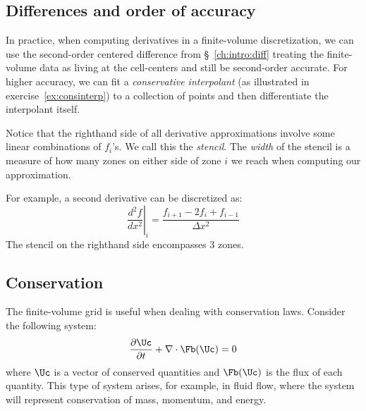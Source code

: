 \subsection{Differences and order of accuracy}

In practice, when computing derivatives in a finite-volume
discretization, we can use the second-order centered difference from
\S~\ref{ch:intro:diff} treating the finite-volume data as living at the
cell-centers and still be second-order accurate.  For higher accuracy,
we can fit a {\em conservative interpolant} (as illustrated in
exercise~\ref{ex:consinterp}) to a collection of points and then
differentiate the interpolant itself.  

Notice that the righthand side of all derivative approximations involve
some linear combinations of $f_i$'s.  We call this the {\em stencil}.
The {\em width} of the stencil is a measure of how many zones on
either side of zone $i$ we reach when computing our approximation.

For example, a second derivative can be discretized as:
\begin{equation}
\left . \frac{d^2 f}{dx^2} \right |_i = \frac{f_{i+1} - 2 f_i + f_{i-1}}{\Delta x^2}
\end{equation}
The stencil on the righthand side encompasses 3 zones.

\subsection{Conservation}

The finite-volume grid is useful when dealing with conservation laws.
Consider the following system:
\begin{equation}
\frac{\partial \Uc}{\partial t} + \nabla \cdot \Fb(\Uc) = 0
\end{equation}
where $\Uc$ is a vector of conserved quantities and $\Fb(\Uc)$ is the flux
of each quantity.  This type of system arises, for example, in fluid
flow, where the system will represent conservation of mass, momentum,
and energy.

